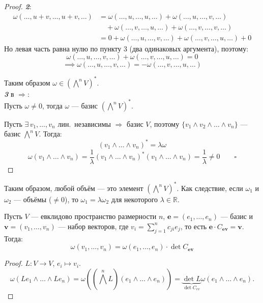 \begin{stmt}
\begin{proof}
        \textbf{\emph{2}}:
        \begin{align*}
            \omega(\dots, u+v, \dots, u+v, \dots)
            &= \omega(\dots, u, \dots, u, \dots)
            + \omega(\dots, u, \dots, v, \dots) \\
            &\quad + \omega(\dots, v, \dots, u, \dots)
            + \omega(\dots, v, \dots, v, \dots) \\
            &= 0 + \omega(\dots, u, \dots, v, \dots)
            + \omega(\dots, v, \dots, u, \dots) + 0
        \end{align*}
        Но левая часть равна нулю по пункту 3 (два одинаковых аргумента), поэтому:
        \[
            \omega(\dots, u, \dots, v, \dots) + \omega(\dots, v, \dots, u, \dots) = 0
        \]
        \[
            \implies \omega(\dots, u, \dots, v, \dots) = -\omega(\dots, v, \dots, u, \dots)
        \]

        Таким образом $\omega \in (\bigwedge^n V)^*$. \\


        \textbf{\emph{3}} в \textcircled{$\Rightarrow$}: \\
        Пусть $\omega \neq 0$, тогда
        $\omega$ --- базис $(\bigwedge^n V)^*$.

        Пусть $\exists\, v_1, \dots, v_n$ лин.\ независимы $\Rightarrow$ базис $V$,
        поэтому $\{v_1 \wedge v_2 \wedge \dots \wedge v_n\}$ --- базис $\bigwedge^n V$. Тогда:
        \[
            (v_1 \wedge \dots \wedge v_n)^* = \lambda\omega
        \]
        \[
            \omega(v_1 \wedge \dots \wedge v_n)
            = \frac{1}{\lambda}(v_1 \wedge \dots \wedge v_n)^*(v_1 \wedge \dots \wedge v_n)
            = \frac{1}{\lambda} \neq 0 \qquad \square
        \]

    \end{proof}
\end{stmt}



\begin{remark}
    Таким образом, любой объём --- это элемент $(\bigwedge^n V)^*$.
    Как следствие, если $\omega_1$ и $\omega_2$ --- объёмы ($\neq 0$), то
    $\omega_1 = \lambda \omega_2$ для некоторого $\lambda \in \mathbb{R}$.
\end{remark}


\begin{stmt}
    Пусть $V$ --- евклидово пространство размерности $n$,
    $\mathbf{e} = (e_1, \dots, e_n)$ --- базис и $\mathbf{v} = (v_1, \dots, v_n)$ --- набор векторов,
    где $v_i = \sum_{j=1}^{n} c_{ji} e_j$, то есть $\mathbf{e} \cdot C_{\mathbf{e}\mathbf{v}} = \mathbf{v}$. Тогда:
    \[
        \omega(v_1, \dots, v_n) = \omega(e_1, \dots, e_n) \cdot \det C_{\mathbf{e}\mathbf{v}}
    \]

    \begin{proof}
        $L \colon V \to V$, $e_i \mapsto v_i$.
        \[
            \omega(Le_1 \wedge \dots \wedge Le_n)
            = \omega((\bigwedge^n L)(e_1 \wedge \dots \wedge e_n))
            = \underbrace{\det L}_{\det C_{ev}} \omega(e_1 \wedge \dots \wedge e_n).
        \]
    \end{proof}
\end{stmt}


